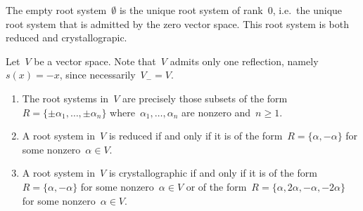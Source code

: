 \begin{example}
  The empty root system~$\emptyset$ is the unique root system of rank~$0$, i.e.\ the unique root system that is admitted by the zero vector space.
  This root system is both reduced and crystallograpic.
\end{example}


\begin{example}
  Let~$V$ be a {\onedimensional} vector space.
  Note that~$V$ admits only one reflection, namely~$s(x) = -x$, since necessarily~$V_- = V$.
  \begin{enumerate}
    \item
      The root systems in~$V$ are precisely those subsets of the form~$R = \{ \pm \alpha_1, \dotsc, \pm \alpha_n \}$ where~$\alpha_1, \dotsc, \alpha_n$ are nonzero and~$n \geq 1$.
      \begin{center}
      \end{center}
    \item
      A root system in~$V$ is reduced if and only if it is of the form~$R = \{\alpha, -\alpha\}$ for some nonzero~$\alpha \in V$.
      \begin{center}
      \end{center}
    \item
      A root system in~$V$ is crystallographic if and only if it is of the form~$R = \{\alpha, -\alpha\}$ for some nonzero~$\alpha \in V$ or of the form~$R = \{\alpha, 2\alpha, -\alpha, -2\alpha\}$ for some nonzero~$\alpha \in V$.
      \begin{center}
      \end{center}
      

\end{enumerate}
\end{example}
